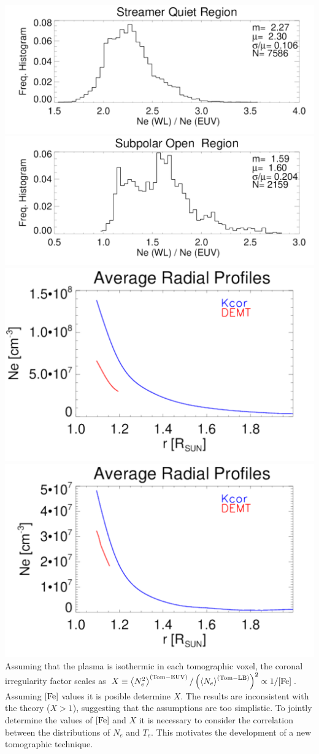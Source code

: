 \documentclass[a0,portrait,final]{baposter_old}
\def\azul#1{\textcolor{blue}{\bf\sf #1}}
\def\saltito{\vskip 0.1cm}
\def\saltito{\vskip 0.1cm}
\def\AvgNeSQ{\left< N_e^2 \right>}
\def\AvgNe{\left< N_e \right>}
\def\AFe{[\rm{Fe}]}
\begin{document}
\begin{poster}
{{\begin{center}
  \includegraphics[width=0.37\columnwidth]{comparison_KCOR-Tom_vs_DEMT_CR2198_h_l799_reduced_kcor_1e4_newgrid-Quiet-region1_ratio_range1105-1195_Rsun.pdf}
  \includegraphics[width=0.37\columnwidth]{comparison_KCOR-Tom_vs_DEMT_CR2198_h_l799_reduced_kcor_1e4_newgrid-Open-region_N_ratio_range1105-1155_Rsun.pdf}\\
  \includegraphics[width=0.37\columnwidth]{Average_Radial_Profiles_KCOR-Tom_vs_DEMT_CR2198_h_l799_reduced_kcor_1e4_newgrid-Quiet-region1.pdf}
  \includegraphics[width=0.37\columnwidth]{Average_Radial_Profiles_KCOR-Tom_vs_DEMT_CR2198_h_l799_reduced_kcor_1e4_newgrid-Open-region_N.pdf}
  \\
  \hrulefill
  \saltito
  Assuming that the plasma is isothermic in each tomographic voxel, the coronal irregularity factor scales as
  \azul{$X \equiv \AvgNeSQ^{(\rm{Tom-EUV})} / \left(\AvgNe^{(\rm{Tom-LB})}\right)^2 \propto 1 / \AFe$}.
  \saltito
  Assuming $\AFe$ values it is posible determine $X$. The results are inconsistent with the theory ($X>1$), suggesting that the assumptions are too simplistic.
  \saltito
  To jointly determine the values of $\AFe$ and $X$ it is necessary to consider the correlation between the distributions of $N_e$ and $T_e$. This motivates the development of a new tomographic technique.

\end{center}
}
}


\end{poster}
\end{document}

